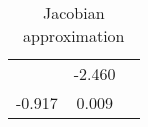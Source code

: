 
    \begin{table}\caption{Jacobian approximation}
\centering
    \begin{tabular}{|l|c|c|}
    \toprule
    \miderule65 & -2.460\\
-0.917 & 0.009\\

      \bottomrule
      \end{tabular}
      \end{table}